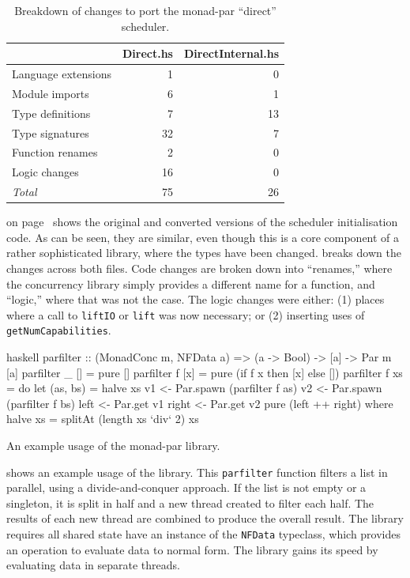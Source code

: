 \begin{table}
  \centering
  \begin{tabular}{lrr} \toprule
    & Direct.hs & DirectInternal.hs \\ \midrule
    Language extensions & 1 & 0 \\
    Module imports & 6 & 1 \\
    Type definitions & 7 & 13 \\
    Type signatures & 32 & 7 \\
    Function renames & 2 & 0 \\
    Logic changes & 16 & 0 \\ \midrule
    \emph{Total} & 75 & 26 \\ \bottomrule
  \end{tabular}
  \caption{Breakdown of changes to port the monad-par ``direct'' scheduler.}\label{tbl:parmonad_diff}
\end{table}

 on page~\pageref{lst:parmonad} shows the original
and converted versions of the scheduler initialisation code.  As can
be seen, they are similar, even though this is a core component of a
rather sophisticated library, where the types have been changed.
 breaks down the changes across both files.
Code changes are broken down into ``renames,'' where the concurrency
library simply provides a different name for a function, and
``logic,'' where that was not the case.  The logic changes were
either: (1) places where a call to \verb|liftIO| or \verb|lift| was
now necessary; or (2) inserting uses of \verb|getNumCapabilities|.

\begin{listing}
\centering
\begin{cminted}{haskell}
parfilter :: (MonadConc m, NFData a) => (a -> Bool) -> [a] -> Par m [a]
parfilter _ []  = pure []
parfilter f [x] = pure (if f x then [x] else [])
parfilter f xs  = do
    let (as, bs) = halve xs
    v1 <- Par.spawn (parfilter f as)
    v2 <- Par.spawn (parfilter f bs)
    left  <- Par.get v1
    right <- Par.get v2
    pure (left ++ right)
  where
    halve xs = splitAt (length xs `div` 2) xs
\end{cminted}
\caption{An example usage of the monad-par library.}\label{lst:parmonad_example1}
\end{listing}

 shows an example usage of the library.
This \verb|parfilter| function filters a list in parallel, using a
divide-and-conquer approach.  If the list is not empty or a singleton,
it is split in half and a new thread created to filter each half.  The
results of each new thread are combined to produce the overall result.
The library requires all shared state have an instance of the
\verb|NFData| typeclass, which provides an operation to evaluate data
to normal form.  The library gains its speed by evaluating data in
separate threads.

